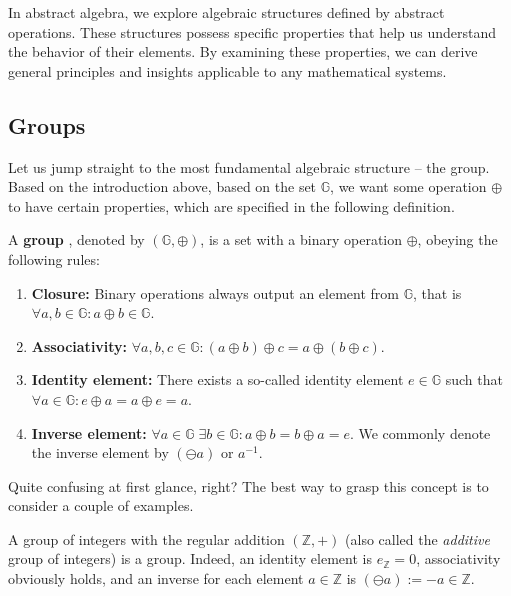 \documentclass[../lecture-notes-148x210.tex]{subfiles}
\begin{document}
In abstract algebra, we explore algebraic structures defined by abstract operations. These 
structures possess specific properties that help us understand the behavior of their elements.
By examining these properties, we can derive general principles and insights applicable to 
any mathematical systems.

\subsection{Groups}

Let us jump straight to the most fundamental algebraic structure -- the group. Based on the introduction 
above, based on the set $\mathbb{G}$, we want some operation $\oplus$ to have certain properties, which 
are specified in the following definition.

\begin{definition}
    A \textbf{group} \cite[section 3]{Judson_2012}, denoted by $(\mathbb{G}, \oplus)$, is a set with a binary operation $\oplus$, obeying the following rules:
    \begin{enumerate}
        \item \textbf{Closure:} Binary operations always output an element from $\mathbb{G}$, that is $\forall a,b \in \mathbb{G}: a \oplus b \in \mathbb{G}$.
        \item \textbf{Associativity:} $\forall a,b,c \in \mathbb{G}: (a \oplus b)\oplus c = a \oplus (b \oplus c)$.
        \item \textbf{Identity element:} There exists a so-called identity element $e \in \mathbb{G}$ such that $\forall a \in \mathbb{G}: e \oplus a = a \oplus e = a$.
        \item \textbf{Inverse element:} $\forall a \in \mathbb{G} \; \exists b \in \mathbb{G}: a\oplus b = b \oplus a = e$. We commonly denote the inverse element by $(\ominus a)$ or $a^{-1}$.
    \end{enumerate}
\end{definition}

Quite confusing at first glance, right? The best way to grasp this concept is to consider a couple of examples.

\begin{example}
    A group of integers with the regular addition $(\mathbb{Z},+)$ (also called the \textit{additive} group of integers) is a group. Indeed, an identity element is $e_{\mathbb{Z}}=0$, associativity obviously holds, and an inverse for each element $a \in \mathbb{Z}$ is $(\ominus a) := -a \in \mathbb{Z}$. 
\end{example}
\end{document}
